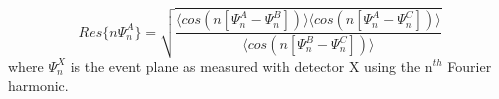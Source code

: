 \begin{equation}
\label{eqn3se}
Res\{n \Psi_n^{A}\} = \sqrt{\frac{\langle cos(n[\Psi_n^{A}-\Psi_n^{B}])\rangle \langle cos(n[\Psi_n^{A}-\Psi_n^{C}])\rangle}{\langle cos(n[\Psi_n^{B}-\Psi_n^{C}])\rangle}}
\end{equation} 
where $\Psi_n^X$ is the event plane as measured with detector X using the n$^{th}$ Fourier harmonic.
\pagebreak
\pagebreak
